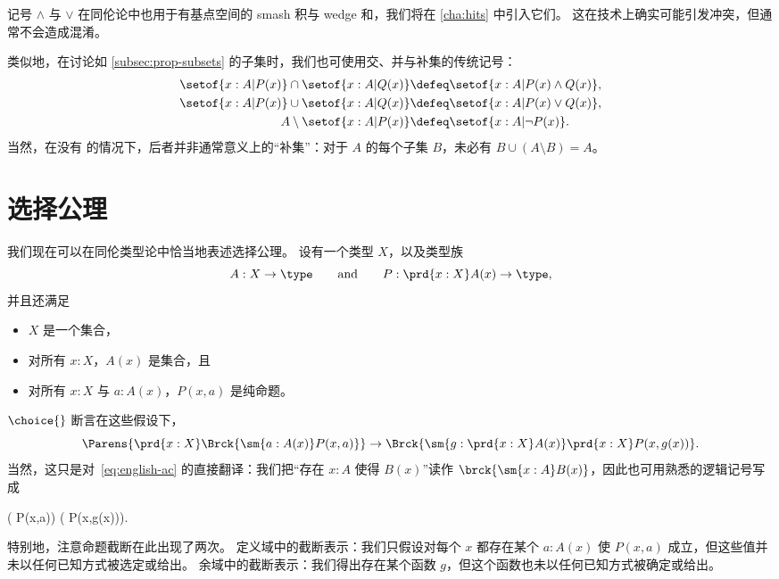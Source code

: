 记号 $\land$ 与 $\lor$ 在同伦论中也用于有基点空间的 smash 积与 wedge 和，我们将在 \cref{cha:hits} 中引入它们。
这在技术上确实可能引发冲突，但通常不会造成混淆。

类似地，在讨论如 \cref{subsec:prop-subsets} 的子集时，我们也可使用交、并与补集的传统记号：
%
%
%
%
%
%
\begin{align*}
  \setof{x:A | P(x)} \cap \setof{x:A | Q(x)}
  &\defeq \setof{x:A | P(x) \land Q(x)},\\
  \setof{x:A | P(x)} \cup \setof{x:A | Q(x)}
  &\defeq \setof{x:A | P(x) \lor Q(x)},\\
  A \setminus \setof{x:A | P(x)}
  &\defeq \setof{x:A | \neg P(x)}.
\end{align*}
当然，在没有 \LEM{} 的情况下，后者并非通常意义上的“补集”：对于 $A$ 的每个子集 $B$，未必有 $B \cup (A\setminus B) = A$。

%
%
%


\section{选择公理}
\label{sec:axiom-choice}

%
%
我们现在可以在同伦类型论中恰当地表述选择公理。
设有一个类型 $X$，以及类型族
%
\begin{equation*}
  A:X\to\type
  \qquad\text{and}\qquad
  P:\prd{x:X} A(x)\to\type,
\end{equation*}
%
并且还满足
\begin{itemize}
\item $X$ 是一个集合，
\item 对所有 $x:X$，$A(x)$ 是集合，且
\item 对所有 $x:X$ 与 $a:A(x)$，$P(x,a)$ 是纯命题。
\end{itemize}
$\choice{}$ 断言在这些假设下，
\begin{equation}\label{eq:ac}
  \Parens{\prd{x:X} \Brck{\sm{a:A(x)} P(x,a)}}
  \to
  \Brck{\sm{g:\prd{x:X} A(x)} \prd{x:X} P(x,g(x))}.
\end{equation}
当然，这只是对~\eqref{eq:english-ac} 的直接翻译：我们把“存在 $x:A$ 使得 $B(x)$”读作 $\brck{\sm{x:A}B(x)}$，因此也可用熟悉的逻辑记号写成
\begin{narrowmultline*}
  \textstyle
  \Big( P(x,a)\Big)
  \Rightarrow \narrowbreak
  \Big(  P(x,g(x))\Big).
\end{narrowmultline*}
%
特别地，注意命题截断在此出现了两次。
定义域中的截断表示：我们只假设对每个 $x$ 都存在某个 $a:A(x)$ 使 $P(x,a)$ 成立，但这些值并未以任何已知方式被选定或给出。
余域中的截断表示：我们得出存在某个函数 $g$，但这个函数也未以任何已知方式被确定或给出。

